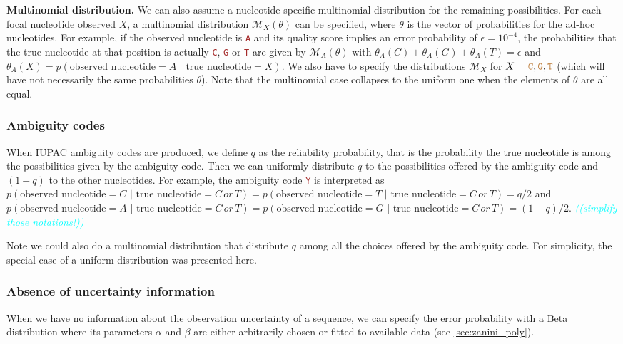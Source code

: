 \documentclass[10pt]{article}
\newcommand{\comment}[1]{\textsl{\textcolor{cyan}{((#1))}}}
\newcommand{\sq}[1]{\texttt{\textcolor{brown}{#1}}}
\newcommand{\md}{\mathcal{M}} %
\begin{document}
\textbf{Multinomial distribution.} We can also assume a nucleotide-specific multinomial distribution for the remaining possibilities. For each focal nucleotide observed $X$, a multinomial distribution $\md_X(\theta)$ can be specified, where $\theta$ is the vector of probabilities for the ad-hoc nucleotides.
For example, if the observed nucleotide is \sq{A} and its quality score implies an error probability of $\epsilon = 10^{-4}$, the probabilities that the true nucleotide at that position is actually \sq{C}, \sq{G} or \sq{T} are given by $\md_A(\theta)$ with $\theta_A(C) + \theta_A(G) + \theta_A(T) = \epsilon$ and $\theta_A(X) = p(\text{observed nucleotide} = A \,\,|\,\, \text{true nucleotide} = X )$.
We also have to specify the distributions $\md_X$ for $X=\sq{C},\sq{G},\sq{T}$ (which will have not necessarily the same probabilities $\theta$).
Note that the multinomial case collapses to the uniform one when the elements of $\theta$ are all equal.


\subsubsection{Ambiguity codes}

When IUPAC ambiguity codes are produced, we define $q$ as the reliability probability, that is the probability the true nucleotide is among the possibilities given by the ambiguity code. Then we can uniformly distribute $q$ to the possibilities offered by the ambiguity code and $(1-q)$ to the other nucleotides.
For example, the ambiguity code \sq{Y} is interpreted as $p(\text{observed nucleotide} = C \,\,|\,\, \text{true nucleotide} = C\, or\, T ) = p(\text{observed nucleotide} = T \,\,|\,\, \text{true nucleotide} = C\, or\, T ) =q/2$ and $p(\text{observed nucleotide} = A \,\,|\,\, \text{true nucleotide} = C\, or\, T ) = p(\text{observed nucleotide} = G \,\,|\,\, \text{true nucleotide} = C\, or\, T ) =(1-q)/2$.
\comment{simplify those notations!}

Note we could also do a multinomial distribution that distribute $q$ among all the choices offered by the ambiguity code. For simplicity, the special case of a uniform distribution was presented here. 


\subsubsection{Absence of uncertainty information}

When we have no information about the observation uncertainty of a sequence, we can specify the error probability with a Beta distribution where its parameters $\alpha$ and $\beta$ are either arbitrarily chosen or fitted to available data (see \ref{sec:zanini_poly}).
\end{document}

